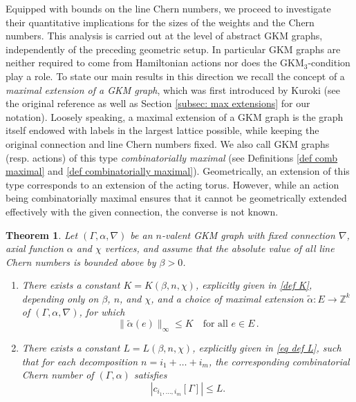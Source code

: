 \documentclass[12pt,a4paper]{amsart}
\newcommand{\ZZ}{\mathbb{Z}}
\newtheorem{thm}{Theorem}[section]
\theoremstyle{plain}
\theoremstyle{definition}
\begin{document}
Equipped with bounds on the line Chern numbers, we proceed to investigate their quantitative implications for the sizes of the weights and the Chern numbers. 
This analysis is carried out at the level of abstract GKM graphs, independently of the preceding geometric setup.
In particular GKM graphs are neither required to come from Hamiltonian actions nor does the GKM$_3$-condition play a role. To state our main results in this direction we recall the concept of a 
\textit{maximal extension of a GKM graph}, which was first introduced by Kuroki (see the original reference
\cite{MR3943448} as well as Section \ref{subsec: max extensions} for our notation).
Loosely speaking, a maximal extension of a GKM graph is the graph itself endowed with labels in the largest lattice possible, while keeping the original connection
and line Chern numbers fixed.
 We also call GKM graphs (resp. actions) of this type \emph{combinatorially maximal} (see Definitions \ref{def comb maximal} and \ref{def combinatorially maximal}). 
 Geometrically, an extension of this type corresponds to an extension of the acting torus. 
 However, while an action being combinatorially maximal ensures that it cannot be geometrically extended effectively with the given connection, the converse is not known.


\begin{thm}\label{thm: boxintro}
Let $(\Gamma,\alpha,\nabla)$ be an $n$-valent GKM graph with fixed connection $\nabla$, axial function $\alpha$ and $\chi$ vertices, and assume that the absolute value of
all line Chern numbers is bounded above by $\beta>0$.
\begin{enumerate}
\item[(i)]
There exists a constant $K=K(\beta,n,\chi)$, explicitly given in \eqref{def K}, depending only on $\beta$,
$n$, and $\chi$, and a choice of maximal extension $\tilde\alpha\colon E\rightarrow \ZZ^k$
of $(\Gamma,\alpha,\nabla)$, for which 
\[
\| \tilde\alpha(e) \|_\infty\leq K\quad \text{for all  } e\in E\,.
\]
\item[(ii)] There exists a constant $L=L(\beta,n,\chi)$, explicitly given in \eqref{eq def L}, such that for each decomposition $n=i_1+\ldots+i_m$, the corresponding combinatorial Chern number of $(\Gamma,\alpha)$ satisfies
\[|c_{i_1,\ldots,i_m}[\Gamma]|\leq L.\]
\end{enumerate}
\end{thm}
\end{document}
